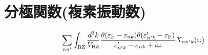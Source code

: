 \documentclass[letterpaper,10pt,dvipdfmx,openany]{sphinxmanual}
\begin{document}
\section{分極関数(複素振動数)}
\label{\detokenize{routine:id7}}\begin{equation*}
\begin{split}\begin{align}
\sum_{n n'}
\int_{\rm BZ} \frac{d^3 k}{V_{\rm BZ}}
\frac{\theta(\varepsilon_{\rm F} - \varepsilon_{n k})
\theta(\varepsilon'_{n' k} - \varepsilon_{\rm F})}
{\varepsilon'_{n' k} - \varepsilon_{n k} + i \omega}
X_{n n' k}(\omega)
\end{align}\end{split}
\end{equation*}
\begin{sphinxVerbatim}[commandchars=\\\{\}]
\end{sphinxVerbatim}
\end{document}

